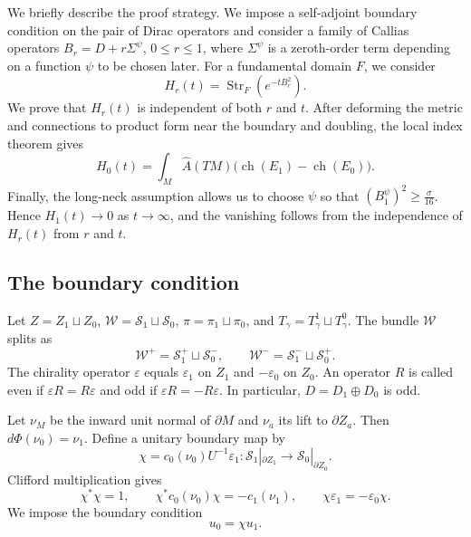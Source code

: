 \documentclass[12pt,reqno]{amsart}
\numberwithin{equation}{section}
\theoremstyle{definition}
\newcommand{\Ahat}{\widehat A}
\newcommand{\ch}{\operatorname{ch}}
\newcommand{\Str}{\operatorname{Str}}
\newcommand{\cS}{\mathcal S}
\newcommand{\cW}{\mathscr W}
\begin{document}
We briefly describe the proof strategy.  We impose a self-adjoint
boundary condition on the pair of Dirac operators and consider a family of
Callias operators $B_r=D+r\Sigma^\psi$, $0\leq r\leq1$,
where $\Sigma^\psi$ is a zeroth-order term depending on a function
$\psi$ to be chosen later.  For a fundamental domain $F$, we consider
\[
 H_r(t)=\Str_F(e^{-tB_r^2}).
\]
We prove that $H_r(t)$ is independent of both $r$ and $t$.  After
deforming the metric and connections to product form near the boundary
and doubling, the local index theorem gives
\[
 H_0(t)=\int_M\Ahat(TM)\bigl(\ch(E_1)-\ch(E_0)\bigr).
\]
Finally, the long-neck assumption allows us to choose $\psi$ so that $(B_1^\psi)^2\geq\frac{\sigma}{16}$.
Hence $H_1(t)\to0$ as $t\to\infty$, and the vanishing follows from the
independence of $H_r(t)$ from $r$ and $t$.





\subsection{The boundary condition}\label{subsec:boundary}

Let $Z=Z_1\sqcup Z_0$, $\cW=\cS_1\sqcup\cS_0$,
$\pi=\pi_1\sqcup\pi_0$, and $T_\gamma=T^1_\gamma\sqcup T^0_\gamma$.
The bundle $\cW$ splits as
\[
 \cW^+=\cS_1^+\sqcup\cS_0^-,\qquad
 \cW^-=\cS_1^-\sqcup\cS_0^+.
\]
The chirality operator $\varepsilon$ equals $\varepsilon_1$ on
$Z_1$ and $-\varepsilon_0$ on $Z_0$.
An operator $R$ is called even if $\varepsilon R=R\varepsilon$ and
odd if $\varepsilon R=-R\varepsilon$.  In particular,
$D=D_1\oplus D_0$ is odd. 

Let $\nu_M$ be the inward unit normal of $\partial M$ and $\nu_a$
its lift to $\partial Z_a$.  Then $d\Phi(\nu_0)=\nu_1$.
Define a unitary boundary map by
\begin{equation}\label{eq:chi-definition}
 \chi=c_0(\nu_0)U^{-1}\varepsilon_1:
 \cS_1|_{\partial Z_1}\longrightarrow\cS_0|_{\partial Z_0}.
\end{equation}
Clifford multiplication gives
\begin{equation}\label{eq:chi-boundary-identities}
 \chi^*\chi=1,\qquad
 \chi^*c_0(\nu_0)\chi=-c_1(\nu_1),\qquad
 \chi\varepsilon_1=-\varepsilon_0\chi.
\end{equation}
We impose the boundary condition
\begin{equation}\label{eq:matching-condition}
 u_0=\chi u_1.
\end{equation}
\end{document}
